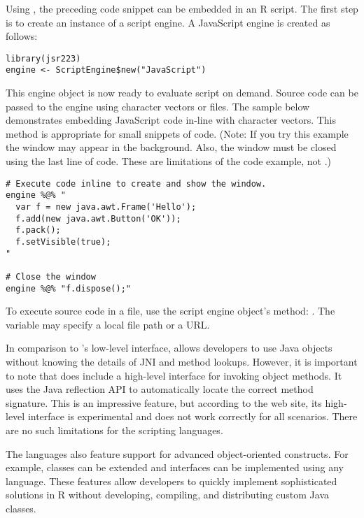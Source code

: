 Using , the preceding code snippet can be embedded in an R script. The first step is to create an instance of a script engine. A JavaScript engine is created as follows:

\begin{verbatim}
library(jsr223)
engine <- ScriptEngine$new("JavaScript")
\end{verbatim}
This engine object is now ready to evaluate script on demand. Source code can be passed to the engine using character vectors or files. The sample below demonstrates embedding JavaScript code in-line with character vectors. This method is appropriate for small snippets of code. (Note: If you try this example the window may appear in the background. Also, the window must be closed using the last line of code. These are limitations of the code example, not .)

\begin{verbatim}
# Execute code inline to create and show the window.
engine %@% "
  var f = new java.awt.Frame('Hello');
  f.add(new java.awt.Button('OK'));
  f.pack();
  f.setVisible(true);
"

# Close the window
engine %@% "f.dispose();"
\end{verbatim}
To execute source code in a file, use the script engine object's  method: . The variable  may specify a local file path or a URL. %

In comparison to 's low-level interface,  allows developers to use Java objects without knowing the details of JNI and method lookups. However, it is important to note that  does include a high-level interface for invoking object methods. It uses the Java reflection API to automatically locate the correct method signature. This is an impressive feature, but according to the  web site, its high-level interface is experimental and does not work correctly for all scenarios. There are no such limitations for the  scripting languages.

The  languages also feature support for advanced object-oriented constructs. For example, classes can be extended and interfaces can be implemented using any language. These features allow developers to quickly implement sophisticated solutions in R without developing, compiling, and distributing custom Java classes.

